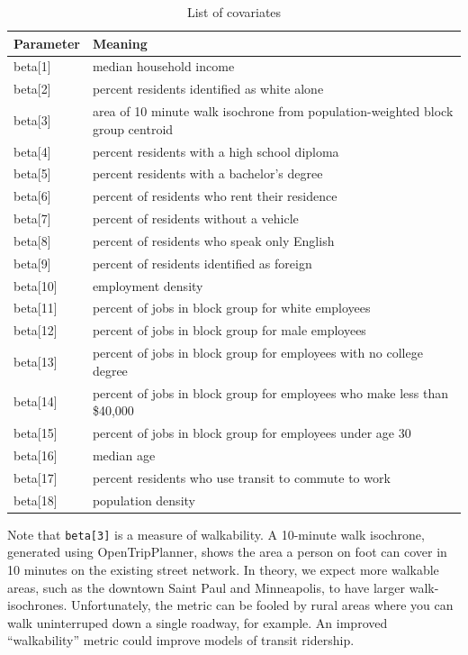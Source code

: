 \documentclass[]{article}
\begin{document}
\begin{table}[H]
\centering
\begin{tabular}{ll} \toprule
    Parameter & Meaning \\ \midrule
    beta[1] & median household income \\ 
    beta[2] & percent residents identified as white alone \\ 
    beta[3] &  area of 10 minute walk isochrone from population-weighted block group centroid \\
    beta[4] &  percent residents with a high school diploma \\
    beta[5] &  percent residents with a bachelor's degree \\
    beta[6] &  percent of residents who rent their residence \\
    beta[7] &  percent of residents without a vehicle \\
    beta[8] &  percent of residents who speak only English \\
    beta[9] &  percent of residents identified as foreign \\
    beta[10] & employment density \\
    beta[11] & percent of jobs in block group for white employees \\
    beta[12] & percent of jobs in block group for male employees \\
    beta[13] & percent of jobs in block group for employees with no college degree \\
    beta[14] & percent of jobs in block group for employees who make less than \$40,000 \\
    beta[15] & percent of jobs in block group for employees under age 30 \\
    beta[16] & median age \\
    beta[17] & percent residents who use transit to commute to work \\
    beta[18] & population density \\
    \bottomrule
 \hline
\end{tabular}
\caption{List of covariates}
\end{table}

Note that \texttt{beta{[}3{]}} is a measure of walkability. A 10-minute
walk isochrone, generated using OpenTripPlanner, shows the area a person
on foot can cover in 10 minutes on the existing street network. In
theory, we expect more walkable areas, such as the downtown Saint Paul
and Minneapolis, to have larger walk-isochrones. Unfortunately, the
metric can be fooled by rural areas where you can walk uninterruped down
a single roadway, for example. An improved ``walkability'' metric could
improve models of transit ridership.
\end{document}
